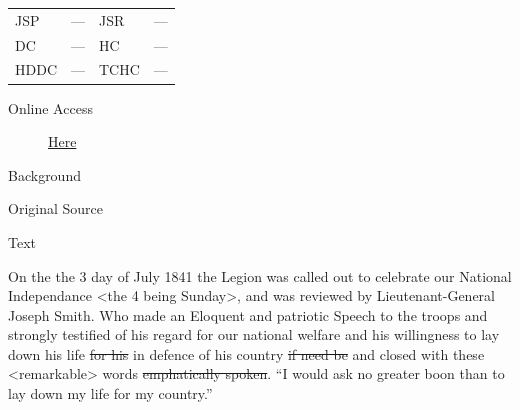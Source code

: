 			\begin{tabular}{p{0.5in}p{1in}p{0.5in}p{1in}}
				JSP	 	& ---		& JSR 		& --- \\
				DC	 	& ---		& HC 		& --- \\
				HDDC 	& ---		& TCHC 		& --- \\
			\end{tabular}
			
			\begin{description}
				\item[Online Access] \href{https://www.josephsmithpapers.org/paper-summary/account-of-meeting-3july-1841/1}{Here}
			\end{description}
			
			\begin{description}
				\item[Background]
			\end{description}
			
			
			\begin{description}
				\item[Original Source]
			\end{description}
			
			
			\begin{description}
				\item[Text]
			\end{description}
			
				On the the 3 day of July 1841 the Legion was called out to celebrate our National Independance <the 4 being Sunday>, and was reviewed by Lieutenant-General Joseph Smith. Who made an Eloquent and patriotic Speech to the troops and strongly testified of his regard for our national welfare and his willingness to lay down his life \sout{for his} in defence of his country \sout{if need be} and closed with these <remarkable> words \sout{emphatically spoken}. ``I would ask no greater boon than to lay down my life for my country.''
				
